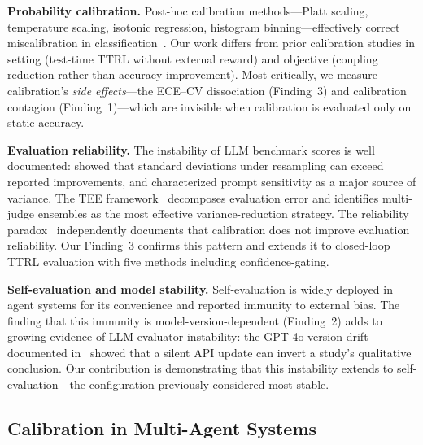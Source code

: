 \documentclass[11pt]{article}
\theoremstyle{definition}
\theoremstyle{remark}
\begin{document}
\textbf{Probability calibration.} Post-hoc calibration methods---Platt scaling, temperature scaling, isotonic regression, histogram binning---effectively correct miscalibration in classification~\citep{guo2017calibration,niculescu2005predicting}. Our work differs from prior calibration studies in setting (test-time TTRL without external reward) and objective (coupling reduction rather than accuracy improvement). Most critically, we measure calibration's \textit{side effects}---the ECE--CV dissociation (Finding~3) and calibration contagion (Finding~1)---which are invisible when calibration is evaluated only on static accuracy.

\textbf{Evaluation reliability.} The instability of LLM benchmark scores is well documented: \citet{dodge2019reproducibility} showed that standard deviations under resampling can exceed reported improvements, and \citet{sclar2024quantifying} characterized prompt sensitivity as a major source of variance. The TEE framework~\citep{messing2026tee} decomposes evaluation error and identifies multi-judge ensembles as the most effective variance-reduction strategy. The reliability paradox~\citep{messing2026tee} independently documents that calibration does not improve evaluation reliability. Our Finding~3 confirms this pattern and extends it to closed-loop TTRL evaluation with five methods including confidence-gating.

\textbf{Self-evaluation and model stability.} Self-evaluation is widely deployed in agent systems for its convenience and reported immunity to external bias. The finding that this immunity is model-version-dependent (Finding~2) adds to growing evidence of LLM evaluator instability: the GPT-4o version drift documented in~\citep{epc2026} showed that a silent API update can invert a study's qualitative conclusion. Our contribution is demonstrating that this instability extends to self-evaluation---the configuration previously considered most stable.




\subsection{Calibration in Multi-Agent Systems}
\end{document}
